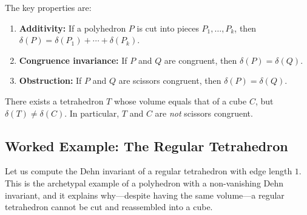 The key properties are:

\begin{enumerate}
    \item \textbf{Additivity:} If a polyhedron $P$ is cut into pieces $P_1, \ldots, P_k$, then $\delta(P) = \delta(P_1) + \cdots + \delta(P_k)$.
    \item \textbf{Congruence invariance:} If $P$ and $Q$ are congruent, then $\delta(P) = \delta(Q)$.
    \item \textbf{Obstruction:} If $P$ and $Q$ are scissors congruent, then $\delta(P) = \delta(Q)$.
\end{enumerate}

\begin{theorem}[Dehn, 1901]\label{thm:dehn}
There exists a tetrahedron $T$ whose volume equals that of a cube $C$, but $\delta(T) \neq \delta(C)$. In particular, $T$ and $C$ are \emph{not} scissors congruent.
\end{theorem}

\subsection{Worked Example: The Regular Tetrahedron}

Let us compute the Dehn invariant of a regular tetrahedron with edge length $1$. This is the archetypal example of a polyhedron with a non-vanishing Dehn invariant, and it explains why---despite having the same volume---a regular tetrahedron cannot be cut and reassembled into a cube.

